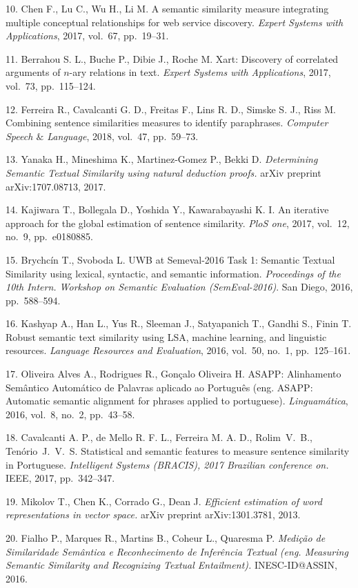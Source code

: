 {10. Chen F., Lu C., Wu H., Li M. A semantic similarity measure
integrating multiple conceptual relationships for web service
discovery. {\it Expert Systems with Applications}, 2017, vol.~67,
pp.~19--31.

11. Berrahou S. L., Buche P., Dibie J., Roche M. Xart: Discovery
of correlated arguments of $n$-ary relations in text. {\it Expert
Systems with Applications}, 2017, vol.~73, pp.~115--124.

12. Ferreira R., Cavalcanti G. D., Freitas F., Lins R. D., Simske
S. J., Riss M. Combining sentence similarities measures to
identify paraphrases. {\it Computer Speech $\&$ Language}, 2018,
vol.~47, pp.~59--73.

13. Yanaka H., Mineshima K., Martinez-Gomez P., Bekki D. {\it
Determining Semantic Textual Similarity using natural deduction
proofs.} arXiv preprint arXiv:1707.08713, 2017.

14. Kajiwara T., Bollegala D., Yoshida Y., Kawarabayashi K. I. An
iterative approach for the global estimation of sentence
similarity. {\it PloS one}, 2017, vol.~12, no.~9, pp.~e0180885.

15. Brychc{\'{i}}n T., Svoboda L. UWB at Semeval-2016 Task 1:
Semantic Textual Similarity using lexical, syntactic, and semantic
information. {\it Proceedings of the 10th Intern. Workshop on
Semantic Evaluation (SemEval-2016)}. San Diego, 2016,
pp.~588--594.

16. Kashyap A., Han L., Yus R., Sleeman J., Satyapanich T., Gandhi
S., Finin T. Robust semantic text similarity using LSA, machine
learning, and linguistic resources. {\it Language Resources and
Evaluation}, 2016, vol.~50, no.~1, pp.~125--161.

17. Oliveira Alves A., Rodrigues R., Gon{\c{c}}alo Oliveira H.
ASAPP: Alinhamento Sem{\^{a}}ntico Autom{\'{a}}tico de Palavras
aplicado ao Portugu{\^{e}}s (eng. ASAPP: Automatic semantic
alignment for phrases applied to portuguese). {\it
Linguam{\'{a}}tica}, 2016, vol.~8, no.~2, pp.~43--58.

18. Cavalcanti A. P., de Mello R. F. L., Ferreira M. A. D.,
Rolim~V.~B., Ten{\'{o}}rio~J.~V.~S. Statistical and semantic
features to measure sentence similarity in Portuguese. {\it
Intelligent Systems (BRACIS), 2017 Brazilian conference on.} IEEE,
2017, pp.~342--347.

19. Mikolov T., Chen K., Corrado G., Dean J. {\it Efficient
estimation of word representations in vector space.} arXiv
preprint arXiv:1301.3781, 2013.

20. Fialho P., Marques R., Martins B., Coheur L., Quaresma P. {\it
Medi{\c{c}}{\~{a}}o de Similaridade Sem{\^{a}}ntica e
Reconhecimento de Infer{\^{e}}ncia Textual (eng. Measuring
Semantic Similarity and Recognizing Textual Entailment).}
INESC-ID@ASSIN, 2016.

}

